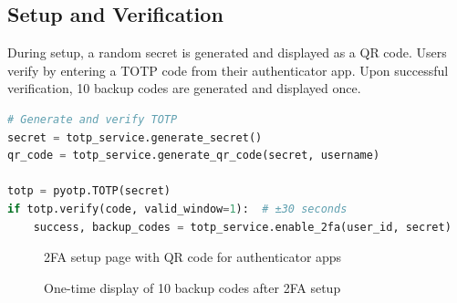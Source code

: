 \documentclass[12pt,a4paper]{article}
\begin{document}
\subsection{Setup and Verification}

During setup, a random secret is generated and displayed as a QR code. Users verify by entering a TOTP code from their authenticator app. Upon successful verification, 10 backup codes are generated and displayed once.

\begin{lstlisting}[language=Python]
# Generate and verify TOTP
secret = totp_service.generate_secret()
qr_code = totp_service.generate_qr_code(secret, username)

totp = pyotp.TOTP(secret)
if totp.verify(code, valid_window=1):  # ±30 seconds
    success, backup_codes = totp_service.enable_2fa(user_id, secret)
\end{lstlisting}

\begin{figure}[H]
    \centering
    \caption{2FA setup page with QR code for authenticator apps}
    \label{fig:2fa_setup}
\end{figure}

\begin{figure}[H]
    \centering
    \caption{One-time display of 10 backup codes after 2FA setup}
    \label{fig:backup}
\end{figure}
\end{document}
